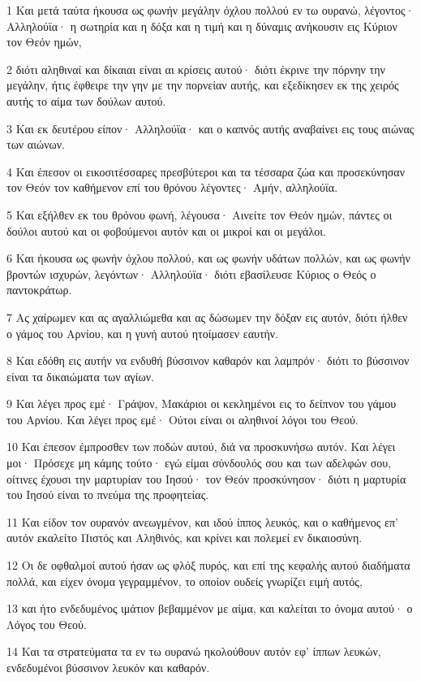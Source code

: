 \par 1 Και μετά ταύτα ήκουσα ως φωνήν μεγάλην όχλου πολλού εν τω ουρανώ, λέγοντος· Αλληλούϊα· η σωτηρία και η δόξα και η τιμή και η δύναμις ανήκουσιν εις Κύριον τον Θεόν ημών,
\par 2 διότι αληθιναί και δίκαιαι είναι αι κρίσεις αυτού· διότι έκρινε την πόρνην την μεγάλην, ήτις έφθειρε την γην με την πορνείαν αυτής, και εξεδίκησεν εκ της χειρός αυτής το αίμα των δούλων αυτού.
\par 3 Και εκ δευτέρου είπον· Αλληλούϊα· και ο καπνός αυτής αναβαίνει εις τους αιώνας των αιώνων.
\par 4 Και έπεσον οι εικοσιτέσσαρες πρεσβύτεροι και τα τέσσαρα ζώα και προσεκύνησαν τον Θεόν τον καθήμενον επί του θρόνου λέγοντες· Αμήν, αλληλούϊα.
\par 5 Και εξήλθεν εκ του θρόνου φωνή, λέγουσα· Αινείτε τον Θεόν ημών, πάντες οι δούλοι αυτού και οι φοβούμενοι αυτόν και οι μικροί και οι μεγάλοι.
\par 6 Και ήκουσα ως φωνήν όχλου πολλού, και ως φωνήν υδάτων πολλών, και ως φωνήν βροντών ισχυρών, λεγόντων· Αλληλούϊα· διότι εβασίλευσε Κύριος ο Θεός ο παντοκράτωρ.
\par 7 Ας χαίρωμεν και ας αγαλλιώμεθα και ας δώσωμεν την δόξαν εις αυτόν, διότι ήλθεν ο γάμος του Αρνίου, και η γυνή αυτού ητοίμασεν εαυτήν.
\par 8 Και εδόθη εις αυτήν να ενδυθή βύσσινον καθαρόν και λαμπρόν· διότι το βύσσινον είναι τα δικαιώματα των αγίων.
\par 9 Και λέγει προς εμέ· Γράψον, Μακάριοι οι κεκλημένοι εις το δείπνον του γάμου του Αρνίου. Και λέγει προς εμέ· Ούτοι είναι οι αληθινοί λόγοι του Θεού.
\par 10 Και έπεσον έμπροσθεν των ποδών αυτού, διά να προσκυνήσω αυτόν. Και λέγει μοι· Πρόσεχε μη κάμης τούτο· εγώ είμαι σύνδουλός σου και των αδελφών σου, οίτινες έχουσι την μαρτυρίαν του Ιησού· τον Θεόν προσκύνησον· διότι η μαρτυρία του Ιησού είναι το πνεύμα της προφητείας.
\par 11 Και είδον τον ουρανόν ανεωγμένον, και ιδού ίππος λευκός, και ο καθήμενος επ' αυτόν εκαλείτο Πιστός και Αληθινός, και κρίνει και πολεμεί εν δικαιοσύνη.
\par 12 Οι δε οφθαλμοί αυτού ήσαν ως φλόξ πυρός, και επί της κεφαλής αυτού διαδήματα πολλά, και είχεν όνομα γεγραμμένον, το οποίον ουδείς γνωρίζει ειμή αυτός,
\par 13 και ήτο ενδεδυμένος ιμάτιον βεβαμμένον με αίμα, και καλείται το όνομα αυτού· ο Λόγος του Θεού.
\par 14 Και τα στρατεύματα τα εν τω ουρανώ ηκολούθουν αυτόν εφ' ίππων λευκών, ενδεδυμένοι βύσσινον λευκόν και καθαρόν.
